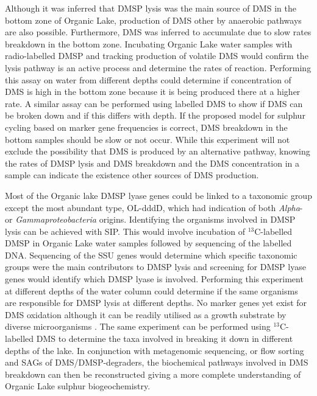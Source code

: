 Although it was inferred that \ac{DMSP} lysis was the main source of \ac{DMS} in the bottom zone of Organic Lake, production of \ac{DMS} other by anaerobic pathways are also possible.
Furthermore, \ac{DMS} was inferred to accumulate due to slow rates breakdown in the bottom zone.
Incubating Organic Lake water samples with radio-labelled \ac{DMSP} and tracking production of volatile \ac{DMS} would confirm the lysis pathway is an active process and determine the rates of reaction.
Performing this assay on water from different depths could determine if concentration of \ac{DMS} is high in the bottom zone because it is being produced there at a higher rate.
A similar assay can be performed using labelled \ac{DMS} to show if \ac{DMS} can be broken down and if this differs with depth.
If the proposed model for sulphur cycling based on marker gene frequencies is correct, \ac{DMS} breakdown in the bottom samples should be slow or not occur.
While this experiment will not exclude the possibility that \ac{DMS} is produced by an alternative pathway, knowing the rates of \ac{DMSP} lysis and \ac{DMS} breakdown and the \ac{DMS} concentration in a sample can indicate the existence other sources of \ac{DMS} production.

Most of the Organic lake \ac{DMSP} lyase genes could be linked to a taxonomic group except the most abundant type, OL-dddD, which had indication of both \emph{Alpha}- or \emph{Gammaproteobacteria} origins.
Identifying the organisms involved in \ac{DMSP} lysis can be achieved with \ac{SIP}.
This would involve incubation of $^{13}$C-labelled \ac{DMSP} in Organic Lake water samples followed by sequencing of the labelled DNA.
Sequencing of the \ac{SSU} genes would determine which specific taxonomic groups were the main contributors to \ac{DMSP} lysis and screening for \ac{DMSP} lyase genes would identify which \ac{DMSP} lyase is involved.
Performing this experiment at different depths of the water column could determine if the same organisms are responsible for \ac{DMSP} lysis at different depths.
No marker genes yet exist for \ac{DMS} oxidation although it can be readily utilised as a growth substrate by diverse microorganisms \cite{Johnston2008}.
The same experiment can be performed using $^{13}$C-labelled \ac{DMS} to determine the taxa involved in breaking it down in different depths of the lake.
In conjunction with metagenomic sequencing, or flow sorting and \acp{SAG} of \ac{DMS}/\ac{DMSP}-degraders, the biochemical pathways involved in \ac{DMS} breakdown can then be reconstructed giving a more complete understanding of Organic Lake sulphur biogeochemistry.


